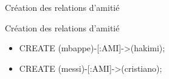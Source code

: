 \begin{frame}{Création des relations d'amitié}
  \begin{block}{Création des relations d'amitié}
    \begin{itemize}
      \item CREATE (mbappe)-[:AMI]->(hakimi);
      \item CREATE (messi)-[:AMI]->(cristiano);
    \end{itemize}
  \end{block}
\end{frame}